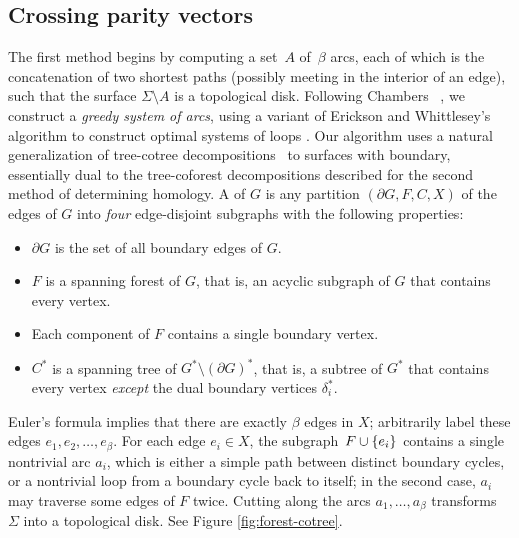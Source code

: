 
\subsection{Crossing parity vectors}
\label{sec:characterizing_crossings}

The first method begins by computing a set~$A$ of~$\beta$ arcs, each of which is the concatenation of two shortest paths (possibly meeting in the interior of an edge), such that the surface $\Sigma\setminus A$ is a topological disk.
Following Chambers \etal~\cite{ccelw-scsih-08}, we construct a \emph{greedy system of arcs}, using a variant of Erickson and Whittlesey's algorithm to construct optimal systems of loops \cite{ew-gohhg-05}.  Our algorithm uses a natural generalization of tree-cotree decompositions~\cite{e-dgteg-03} to surfaces with boundary, essentially dual to the tree-coforest decompositions described for the second method of determining homology.
A  of $G$ is any partition $(\partial\! G, F, C, X)$ of the edges of $G$ into \emph{four} edge-disjoint subgraphs with the following properties:
\begin{itemize}\itemsep0pt
\item $\partial\! G$ is the set of all boundary edges of $G$.
\item $F$ is a spanning forest of $G$, that is, an acyclic subgraph of $G$ that contains every vertex.
\item Each component of $F$ contains a single boundary vertex.
\item $C^*$ is a spanning tree of $G^*\setminus (\partial G)^*$, that is, a subtree of $G^*$ that contains every vertex \emph{except} the dual boundary vertices $\delta_i^*$.
\end{itemize}


Euler's formula implies that there are exactly $\beta$ edges in $X$; arbitrarily label these edges $e_1, e_2, \dots, e_\beta$.  For each edge $e_i\in X$, the subgraph~$F\cup \{ e_i \}$ contains a single nontrivial arc $a_i$, which is either a simple path between distinct boundary cycles, or a nontrivial loop from a boundary cycle back to itself; in the second case, $a_i$ may traverse some edges of $F$ twice.  Cutting along the arcs $a_1, \dots, a_\beta$ transforms~$\Sigma$ into a topological disk. See Figure \ref{fig:forest-cotree}.

